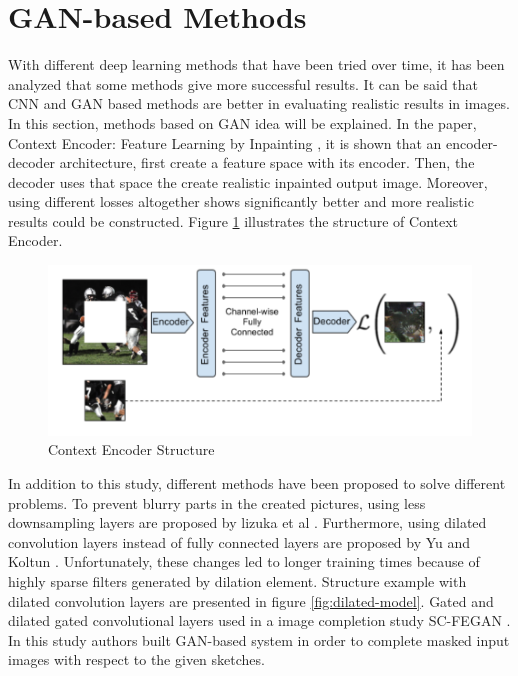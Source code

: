 \section{GAN-based Methods}

With different deep learning methods that have been tried over time, it has been analyzed that some methods give more successful results. It can be said that CNN and GAN based methods are better in evaluating realistic results in images. In this section, methods based on GAN idea will be explained. \newline
In the paper, Context Encoder: Feature Learning by Inpainting \cite{context_encoders}, it is shown that an encoder-decoder architecture, first create a feature space with its encoder. Then, the decoder uses that space the create realistic inpainted output image. Moreover, using different losses altogether shows significantly better and more realistic results could be constructed. Figure \ref{fig:context-encoder} illustrates the structure of Context Encoder.

\begin{figure}[h!]
    \centering
    \includegraphics[scale=0.5]{figures/chapter4/context-encoder-example.png}
    \caption{Context Encoder Structure \cite{context_encoders}}
    \label{fig:context-encoder}
\end{figure}

In addition to this study, different methods have been proposed to solve different problems. To prevent blurry parts in the created pictures, using less downsampling layers are proposed by lizuka et al \cite{Iizuka2017}. Furthermore, using dilated convolution layers instead of fully connected layers are proposed by Yu and Koltun \cite{dilated_conv}. Unfortunately, these changes led to longer training times because of highly sparse filters generated by dilation element. Structure example with dilated convolution layers are presented in figure \ref{fig:dilated-model}. Gated and dilated gated convolutional layers used in a image completion study SC-FEGAN \cite{scfegan}. In this study authors built GAN-based system in order to complete masked input images with respect to the given sketches.


